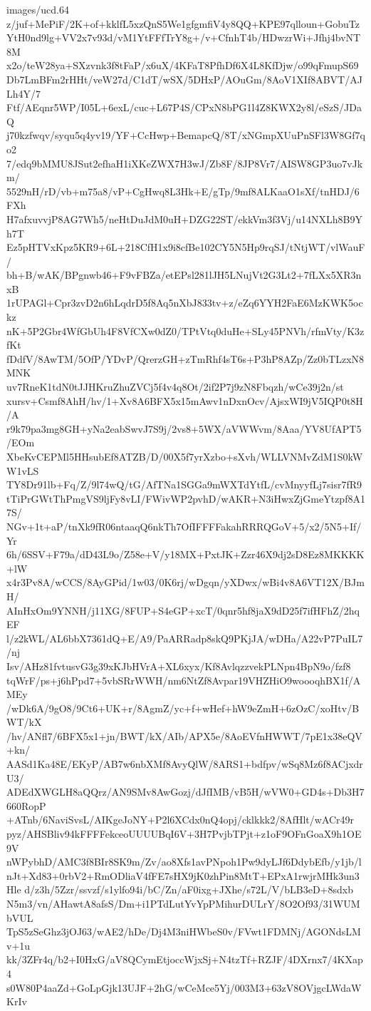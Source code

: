\begin{filecontents*}{images/ucd.64}
z/juf+MePiF/2K+of+kklfL5xzQnS5We1gfgmfiV4y8QQ+KPE97qlloun+GobuTz
YtH0nd9lg+VV2x7v93d/vM1YtFFfTrY8g+/v+CfnhT4b/HDwzrWi+Jfhj4bvNT8M
x2o/teW28ya+SXzvnk3f8tFaP/x6uX/4KFaT8PfhDf6X4L8KfDjw/o99qFmupS69
Db7LmBFm2rHHt/veW27d/C1dT/wSX/5DHxP/AOuGm/8AoV1XIf8ABVT/AJLh4Y/7
Ftf/AEqnr5WP/I05L+6exL/cuc+L67P4S/CPxN8bPG1l4Z8KWX2y8l/eSzS/JDaQ
j70kzfwqv/syqu5q4yv19/YF+CcHwp+BemapcQ/8T/xNGmpXUuPnSFl3W8Gf7qo2
7/edq9bMMU8JSut2efhaH1iXKeZWX7H3wJ/Zb8F/8JP8Vr7/AISW8GP3uo7vJkm/
5529nH/rD/vb+m75a8/vP+CgHwq8L3Hk+E/gTp/9mf8ALKaaO1sXf/tnHDJ/6FXh
H7afxuvvjP8AG7Wh5/neHtDuJdM0uH+DZG22ST/ekkVm3f3Vj/u14NXLh8B9Yh7T
Ez5pHTVxKpz5KR9+6L+218CfH1x9i8cfBe102CY5N5Hp9rqSJ/tNtjWT/vlWauF/
bh+B/wAK/BPgnwb46+F9vFBZa/etEPsl281lJH5LNujVt2G3Lt2+7fLXx5XR3nxB
1rUPAGl+Cpr3zvD2n6hLqdrD5f8Aq5nXbJ833tv+z/eZq6YYH2FaE6MzKWK5ockz
nK+5P2Gbr4WfGbUh4F8VfCXw0dZ0/TPtVtq0duHe+SLy45PNVh/rfmVty/K3zfKt
fDdfV/8AwTM/5OfP/YDvP/QrerzGH+zTmRhf4sT6s+P3hP8AZp/Zz0bTLzxN8MNK
uv7RneK1tdN0tJJHKruZhuZVCj5f4v4q8Ot/2if2P7j9zN8Fbqzh/wCe39j2n/st
xursv+Csmf8AhH/hv/1+Xv8A6BFX5x15mAwv1nDxnOcv/AjsxWI9jV5IQP0t8H/A
r9k79pa3mg8GH+yNa2eabSwvJ7S9j/2vs8+5WX/aVWWvm/8Aaa/YV8UfAPT5/EOm
XbeKvCEPMl5HHsubEf8ATZB/D/00X5f7yrXzbo+sXvh/WLLVNMvZdM1S0kWW1vLS
TY8Dr91lb+Fq/Z/9l74wQ/tG/AfTNa1SGGa9mWXTdYtfL/cvMnyyfLj7sisr7fR9
tTiPrGWtThPmgVS9ljFy8vLI/FWivWP2pvhD/wAKR+N3iHwxZjGmeYtzpf8A17S/
NGv+1t+aP/tnXk9fR06ntaaqQ6nkTh7OfIFFFFakahRRRQGoV+5/x2/5N5+If/Yr
6h/6SSV+F79a/dD43L9o/Z58e+V/y18MX+PxtJK+Zzr46X9dj2sD8Ez8MKKKK+lW
x4r3Pv8A/wCCS/8AyGPid/1w03/0K6rj/wDgqn/yXDwx/wBi4v8A6VT12X/BJmH/
AInHxOm9YNNH/j11XG/8FUP+S4eGP+xcT/0qnr5hf8jaX9dD25f7ifHFhZ/2hqEF
l/z2kWL/AL6bbX7361dQ+E/A9/PaARRadp8skQ9PKjJA/wDHa/A22vP7PuIL7/nj
Isv/AHz81fvtusvG3g39xKJbHVrA+XL6xyx/Kf8AvlqzzvekPLNpn4BpN9o/fzf8
tqWrF/ps+j6hPpd7+5vbSRrWWH/nm6NtZf8Avpar19VHZHiO9woooqhBX1f/AMEy
/wDk6A/9gO8/9Ct6+UK+r/8AgmZ/yc+f+wHef+hW9eZmH+6zOzC/xoHtv/BWT/kX
/hv/ANfl7/6BFX5x1+jn/BWT/kX/AIb/APX5e/8AoEVfnHWWT/7pE1x38eQV+kn/
AASd1Ka48E/EKyP/AB7w6nbXMf8AvyQlW/8ARS1+bdfpv/wSq8Mz6f8ACjxdrU3/
ADEdXWGLH8aQQrz/AN9SMv8AwGozj/dJfIMB/vB5H/wVW0+GD4s+Db3H7660RopP
+ATnb/6NaviSvsL/AIKgeJoNY+P2l6XCdx0nQ4opj/cklkkk2/8AfHlt/wACr49r
pyz/AHSBliv94kFFFFekceoUUUUBqI6V+3H7PvjbTPjt+z1oF9OFnGoaX9h1OE9V
nWPybhD/AMC3f8BIr8SK9m/Zv/ao8Xfs1avPNpoh1Pw9dyLJf6DdybEfb/y1jb/l
nJt+Xd83+0rbV2+RmODliaV4fFE7sHX9jK0zhPin8MtT+EPxA1rwjrMHk3un3Hle
d/z3h/5Zzr/ssvzf/s1ylfo94i/bC/Zn/aF0ixg+JXhe/s72L/V/bLB3eD+8sdxb
N5m3/vn/AHawtA8afsS/Dm+i1PTdLutYvYpPMihurDULrY/8O2Of93/31WUMbVUL
TpS5zSeGhz3jOJ63/wAE2/hDe/Dj4M3niHWbeS0v/FVwt1FDMNj/AGONdsLMv+1u
kk/3ZFr4q/b2+I0HxG/aV8QCymEtjoccWjxSj+N4tzTf+RZJF/4DXrnx7/4KXap4
s0W80P4aaZd+GoLpGjk13UJF+2hG/wCeMce5Yj/003M3+63zV8OVjgcLWdaWKrIv

\end{filecontents*}
